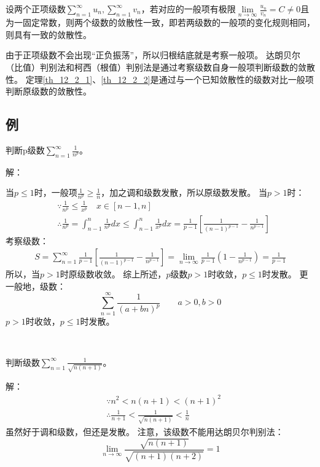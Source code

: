 \begin{theorem} \label{th_12_2_2}
设两个正项级数$\sum_{n=1}^{\infty}{u_n},\sum_{n=1}^{\infty}{v_n}$，若对应的一般项有极限$\underset{n\rightarrow \infty}{\lim}\frac{u_n}{v_n}=C\ne 0$且为一固定常数，则两个级数的敛散性一致，即若两级数的一般项的变化规则相同，则具有一致的敛散性。
\end{theorem}

由于正项级数不会出现“正负振荡”，所以归根结底就是考察一般项。
达朗贝尔（比值）判别法和柯西（根值）判别法是通过考察级数自身一般项判断级数的敛散性。
定理\ref{th_12_2_1}、\ref{th_12_2_2}是通过与一个已知敛散性的级数对比一般项判断原级数的敛散性。

\subsection{例}

\begin{example}
判断p级数$\sum_{n=1}^{\infty}{\frac{1}{n^p}}$。
\end{example}

解：

当$p\leqslant 1$时，一般项$\frac{1}{n^p}\geqslant \frac{1}{n}$，加之调和级数发散，所以原级数发散。
当$p>1$时：
\begin{align*}
&\because \frac{1}{n^p}\leqslant \frac{1}{x^p} \quad x\in \left[ n-1,n \right] \\
&\therefore \frac{1}{n^p}=\int_{n-1}^n{\frac{1}{n^p}dx}\leqslant \int_{n-1}^n{\frac{1}{x^p}dx}=\frac{1}{p-1}\left[ \frac{1}{\left( n-1 \right) ^{p-1}}-\frac{1}{n^{p-1}} \right]
\end{align*}
考察级数：
\begin{align*}
S=\sum_{n=1}^{\infty}{\frac{1}{p-1}\left[ \frac{1}{\left( n-1 \right) ^{p-1}}-\frac{1}{n^{p-1}} \right]}=\underset{n\rightarrow \infty}{\lim}\frac{1}{p-1}\left( 1-\frac{1}{n^{p-1}} \right) =\frac{1}{p-1}
\end{align*}
所以，当$p>1$时原级数收敛。
综上所述，$p$级数$p>1$时收敛，$p\leqslant 1$时发散。
更一般地，级数：
\[
\sum_{n=1}^{\infty}{\frac{1}{\left( a+bn \right) ^p}} \qquad a>0,b>0
\]
$p>1$时收敛，$p\leqslant 1$时发散。

~

\begin{example}
判断级数$\sum_{n=1}^{\infty}{\frac{1}{\sqrt{n\left( n+1 \right)}}}$。
\end{example}

解：
\begin{align*}
&\because n^2<n\left( n+1 \right) <\left( n+1 \right) ^2 \\
&\therefore \frac{1}{n+1}<\frac{1}{\sqrt{n\left( n+1 \right)}}<\frac{1}{n}
\end{align*}
虽然好于调和级数，但还是发散。
注意，该级数不能用达朗贝尔判别法：
\[
\underset{n\rightarrow \infty}{\lim}\frac{\sqrt{n\left( n+1 \right)}}{\sqrt{\left( n+1 \right) \left( n+2 \right)}}=1
\]




